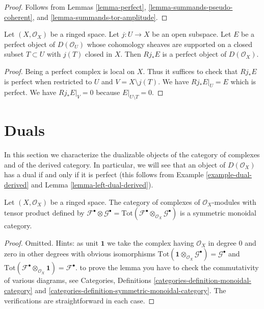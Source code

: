 \begin{proof}
Follows from
Lemmas \ref{lemma-perfect}, \ref{lemma-summands-pseudo-coherent}, and
\ref{lemma-summands-tor-amplitude}.
\end{proof}

\begin{lemma}
\label{lemma-pushforward-perfect}
Let $(X, \mathcal{O}_X)$ be a ringed space. Let $j : U \to X$ be an
open subspace. Let $E$ be a perfect object of $D(\mathcal{O}_U)$
whose cohomology
sheaves are supported on a closed subset $T \subset U$ with $j(T)$
closed in $X$. Then $Rj_*E$ is a perfect object of $D(\mathcal{O}_X)$.
\end{lemma}

\begin{proof}
Being a perfect complex is local on $X$. Thus it suffices to check that
$Rj_*E$ is perfect when restricted to $U$ and $V = X \setminus j(T)$.
We have $Rj_*E|_U = E$ which is perfect. We have
 $Rj_*E|_V = 0$ because $E|_{U \setminus T} = 0$.
\end{proof}






\section{Duals}
\label{section-duals}

\noindent
In this section we characterize the dualizable objects of
the category of complexes and of the derived category.
In particular, we will see that an object of $D(\mathcal{O}_X)$
has a dual if and only if it is perfect (this follows from
Example \ref{example-dual-derived} and
Lemma \ref{lemma-left-dual-derived}).

\begin{lemma}
\label{lemma-symmetric-monoidal-cat-complexes}
Let $(X, \mathcal{O}_X)$ be a ringed space. The category of complexes
of $\mathcal{O}_X$-modules with tensor product defined by
$\mathcal{F}^\bullet \otimes \mathcal{G}^\bullet =
\text{Tot}(\mathcal{F}^\bullet \otimes_{\mathcal{O}_X} \mathcal{G}^\bullet)$
is a symmetric monoidal category.
\end{lemma}

\begin{proof}
Omitted. Hints: as unit $\mathbf{1}$ we take the complex having
$\mathcal{O}_X$ in degree $0$ and zero in other degrees with
obvious isomorphisms
$\text{Tot}(\mathbf{1} \otimes_{\mathcal{O}_X} \mathcal{G}^\bullet) =
\mathcal{G}^\bullet$ and
$\text{Tot}(\mathcal{F}^\bullet \otimes_{\mathcal{O}_X} \mathbf{1}) =
\mathcal{F}^\bullet$.
to prove the lemma you have to check the commutativity
of various diagrams, see Categories, Definitions
\ref{categories-definition-monoidal-category} and
\ref{categories-definition-symmetric-monoidal-category}.
The verifications are straightforward in each case.
\end{proof}


